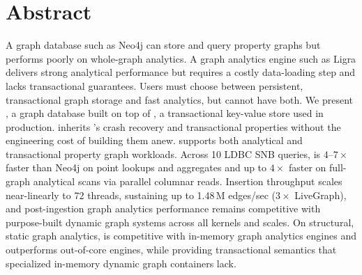 \chapter{Abstract}
A graph database such as Neo4j can store and query property graphs but performs poorly on whole-graph analytics.
A graph analytics engine such as Ligra delivers strong analytical performance but requires a costly data-loading step and lacks transactional guarantees.
Users must choose between persistent, transactional graph storage and fast analytics, but cannot have both.
We present \project{}, a graph database built on top of \wt{}, a transactional key-value store used in production. 
\project{} inherits \wt{}'s crash recovery and transactional properties without the engineering cost of building them anew.
\project{} supports both analytical and transactional property graph workloads.
Across 10 LDBC SNB queries, \project{} is $4$--$7\times$ faster than Neo4j on point lookups and aggregates and up to $4\times$ faster on full-graph analytical scans via parallel columnar reads.
Insertion throughput scales near-linearly to 72 threads, sustaining up to 1.48\,M edges/sec ($3\times$ LiveGraph), and post-ingestion graph analytics performance remains competitive with purpose-built dynamic graph systems across all kernels and scales.
On structural, static graph analytics, \project{} is competitive with in-memory graph analytics engines and outperforms out-of-core engines, while providing transactional semantics that specialized in-memory dynamic graph containers lack.
